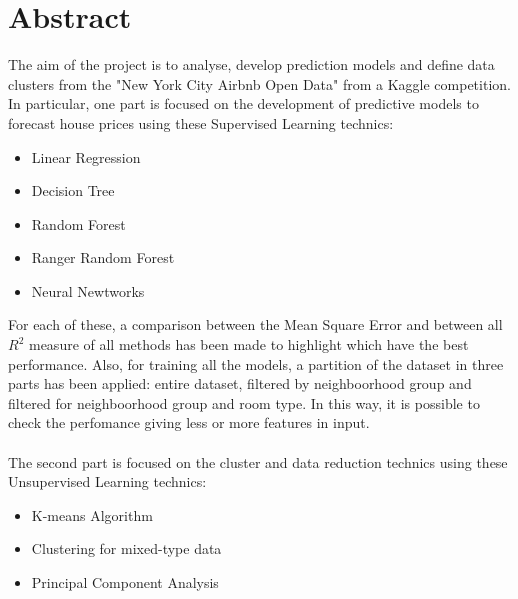 \documentclass{FR16}
\begin{document}
\maketitle

\newpage
\tableofcontents
\newpage
\listoffigures
\newpage
\section{Abstract}
The aim of the project is to analyse, develop prediction models and define data clusters from the "New York City Airbnb Open Data" from a Kaggle competition.
\\ In particular, one part is focused on the development of predictive models to forecast house prices using these Supervised Learning technics:\begin{itemize}
\itemsep0em 
\item Linear Regression
\item Decision Tree
\item Random Forest
\item Ranger Random Forest
\item Neural Newtworks
\end{itemize}
For each of these, a comparison between the Mean Square Error and between all $R^2$ measure of all methods has been made to highlight which have the best performance. Also, for training all the models, a partition of the dataset in three parts has been applied: entire dataset, filtered by neighboorhood group and filtered for neighboorhood group and room type. In this way, it is possible to check the perfomance giving less or more features in input.\\\\
The second part is focused on the cluster and data reduction technics using these Unsupervised Learning technics:
\begin{itemize}
\itemsep0em
\item K-means Algorithm 
\item Clustering for mixed-type data
\item Principal Component Analysis
\end{itemize}
\end{document}
